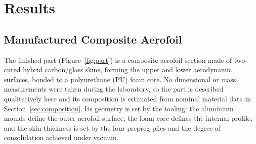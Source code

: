 \documentclass[11pt,a4paper]{article}
\newenvironment{addedblock}{\color{addgreen}}{}
\newenvironment{addedblock}{}{}
\begin{document}
\section{Results}

\begin{addedblock}
\subsection{Manufactured Composite Aerofoil}

The finished part (Figure~\ref{fig:part}) is a composite aerofoil
section made of two cured hybrid carbon/glass skins, forming the upper
and lower aerodynamic surfaces, bonded to a polyurethane (PU) foam
core. No dimensional or mass measurements were taken during the
laboratory, so the part is described qualitatively here and its
composition is estimated from nominal material data in
Section~\ref{sec:composition}. Its geometry is set by the tooling: the
aluminium moulds define the outer aerofoil surface, the foam core
defines the internal profile, and the skin thickness is set by the
four prepreg plies and the degree of consolidation achieved under
vacuum.
\end{addedblock}
\end{document}
